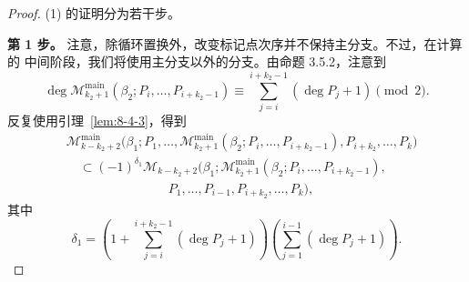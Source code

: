 \begin{proof}
(1) 的证明分为若干步。

\par\smallskip\noindent\textbf{第 1 步。}
注意，除循环置换外，改变标记点次序并不保持主分支。不过，在计算的
中间阶段，我们将使用主分支以外的分支。由命题 3.5.2，注意到
\[
 \deg\mathcal M_{k_2+1}^{\mathrm{main}}
 (\beta_2;P_i,\ldots,P_{i+k_2-1})
 \equiv\sum_{j=i}^{i+k_2-1}(\deg P_j+1)\pmod2.
\]
反复使用引理~\ref{lem:8-4-3}，得到
\[
\begin{aligned}
 &\mathcal M_{k-k_2+2}^{\mathrm{main}}
 \bigl(\beta_1;P_1,\ldots,
 \mathcal M_{k_2+1}^{\mathrm{main}}
 (\beta_2;P_i,\ldots,P_{i+k_2-1}),
 P_{i+k_2},\ldots,P_k\bigr)\\
 &\quad\subset
 (-1)^{\delta_1}\mathcal M_{k-k_2+2}
 \bigl(\beta_1;
 \mathcal M_{k_2+1}^{\mathrm{main}}
 (\beta_2;P_i,\ldots,P_{i+k_2-1}),\\[-2pt]
 &\hspace{8em}P_1,\ldots,P_{i-1},
 P_{i+k_2},\ldots,P_k\bigr),
\end{aligned}
\]
其中
\[
 \delta_1=\left(1+\sum_{j=i}^{i+k_2-1}(\deg P_j+1)\right)
 \left(\sum_{j=1}^{i-1}(\deg P_j+1)\right).
\]


\end{proof}
